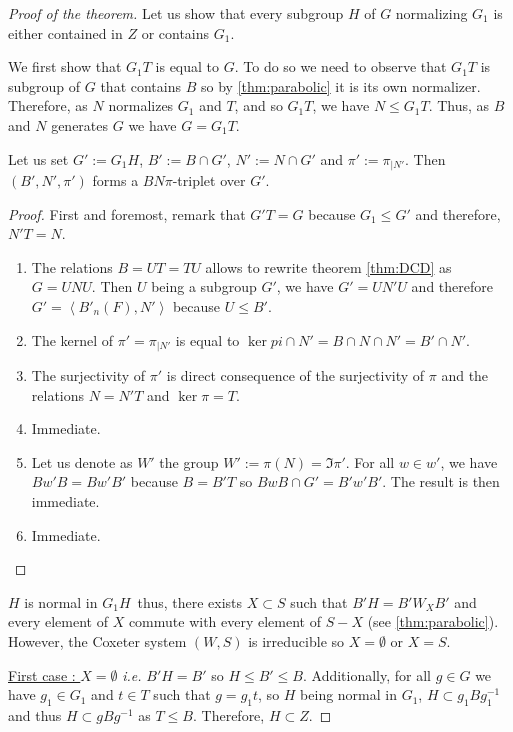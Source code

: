 \begin{proof}[Proof of the theorem]

Let us show that every subgroup $H$ of $G$ normalizing $G_1$ is either contained in $Z$ or contains $G_1$.

    We first show that $G_1T$ is equal to $G$. To do so we need to observe that $G_1T$ is subgroup of $G$ that contains $B$ so by \ref{thm:parabolic} it is its own normalizer. Therefore, as $N$ normalizes $G_1$ and $T$, and so $G_1T$, we have $N \le G_{1}T$. Thus, as $B$ and $N$ generates $G$ we have $G = G_1T$.

    \begin{lemme} \label{lem:subBN}
        Let us set $G' := G_1 H$, $B' := B \cap G'$, $N' := N \cap G'$ and $\pi' := \pi_{|N'}$. 
        Then $\left( B', N', \pi' \right)$ forms a $BN\pi$-triplet over $G'$.
    \end{lemme}
    \begin{proof}
        First and foremost, remark that $G'T = G$ because $G_1 \le G'$ and therefore, $N'T = N$.
        \begin{enumerate}
            \item The relations $B=UT=TU$ allows to rewrite theorem \ref{thm:DCD} as $G = UNU$. Then $U$ being a subgroup $G'$, we have $G' = UN'U$ and therefore $G' = \left<B'_n(F),N' \right>$ because $U \le B'$.
            \item The kernel of $\pi' = \pi_{|N'}$ is equal to $\ker pi \cap N' = B \cap N \cap N' = B' \cap N' $.
            \item The surjectivity of $\pi'$ is direct consequence of the surjectivity of $\pi$ and the relations $N=N'T$ and $\ker \pi = T$.
            \item Immediate.
            \item Let us denote as $W'$ the group $W' := \pi (N) =  \Im \pi'$. For all $w \in w'$, we have $Bw'B = Bw'B'$ because $B = B'T$ so $BwB \cap G' = B'w'B'$. The result is then immediate.
            \item Immediate.
        \end{enumerate}
    \end{proof}

   $H$ is normal in $G_1 H$\ thus, there exists $X \subset S$ such that $B'H = B' W_X B'$ and every element of $X$ commute with every element of $S-X$ (see \ref{thm:parabolic}). However, the Coxeter system $\left( W,S \right)$ is irreducible so $X = \emptyset$ or $X = S$.

     \underline{First case : $X = \emptyset$} \textit{i.e.} $B' H = B'$ so $H \le B' \le B$. Additionally, for all $g \in G$ we have $g_1 \in G_1$ and $t \in T$ such that $g = g_1 t$, so $H$ being normal in $G_1$, $H \subset g_1 B g_1^{-1}$ and thus $H \subset g B g^{-1}$ as $T \le B$. Therefore, $ H \subset Z$.


\end{proof}
